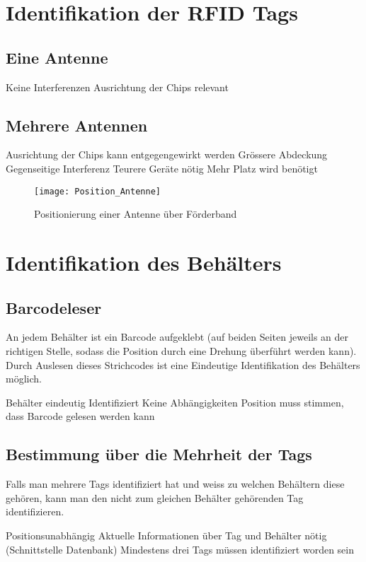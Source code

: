 \section{Identifikation der RFID Tags}

\subsection{Eine Antenne}
\begin{itemize}
	\pro Keine Interferenzen
	\con Ausrichtung der Chips relevant
\end{itemize}

\subsection{Mehrere Antennen}
\begin{itemize}
	\pro Ausrichtung der Chips kann entgegengewirkt werden
	\pro Grössere Abdeckung
	\con Gegenseitige Interferenz
	\con Teurere Geräte nötig
	\con Mehr Platz wird benötigt
\end{itemize}

\begin{figure}
	\centering
	\texttt{[image: Position\_Antenne]}
	\caption{Positionierung einer Antenne über Förderband}
\end{figure}

\section{Identifikation des Behälters}

\subsection{Barcodeleser}
An jedem Behälter ist ein Barcode aufgeklebt (auf beiden Seiten jeweils an der richtigen Stelle, sodass die Position durch eine Drehung überführt werden kann). Durch Auslesen dieses Strichcodes ist eine Eindeutige Identifikation des Behälters möglich.
\begin{itemize}
	\pro Behälter eindeutig Identifiziert
	\pro Keine Abhängigkeiten
	\con Position muss stimmen, dass Barcode gelesen werden kann
\end{itemize}

\subsection{Bestimmung über die Mehrheit der Tags}
Falls man mehrere Tags identifiziert hat und weiss zu welchen Behältern diese gehören, kann man den nicht zum gleichen Behälter gehörenden Tag identifizieren.
\begin{itemize}
	\pro Positionsunabhängig
	\con Aktuelle Informationen über Tag und Behälter nötig (Schnittstelle Datenbank)
	\con Mindestens drei Tags müssen identifiziert worden sein
\end{itemize}

